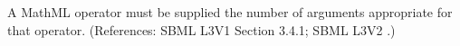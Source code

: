 A MathML operator must be supplied the number of arguments appropriate for
that operator.  (References: SBML L3V1 Section 3.4.1; SBML L3V2 .)
